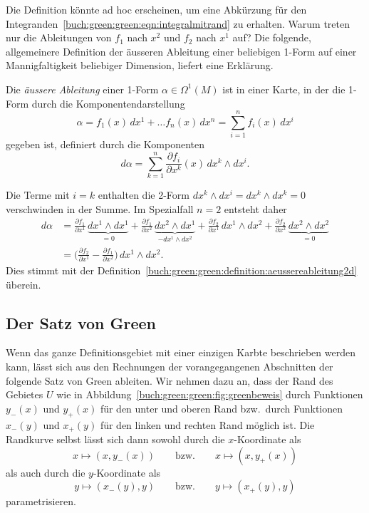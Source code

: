 Die Definition könnte ad hoc erscheinen, um eine Abkürzung für den
Integranden~\eqref{buch:green:green:eqn:integralmitrand} zu erhalten.
Warum treten nur die Ableitungen von $f_1$ nach $x^2$ und
$f_2$ nach $x^1$ auf?
Die folgende, allgemeinere Definition der äusseren Ableitung 
einer beliebigen 1-Form auf einer Mannigfaltigkeit beliebiger 
Dimension, liefert eine Erklärung.

\begin{definition}
Die {\em äussere Ableitung} einer 1-Form $\alpha\in\Omega^1(M)$ ist
in einer Karte, in der die 1-Form durch die Komponentendarstellung
\[
\alpha
=
f_1(x)\,dx^1 + \dots f_n(x)\, dx^n
=
\sum_{i=1}^n f_i(x)\,dx^i
\]
gegeben ist,
definiert durch die Komponenten
\[
d\alpha
=
\sum_{k=1}^n
\frac{\partial f_i}{\partial x^k}(x)
\,dx^k\wedge dx^i.
\]
\end{definition}

Die Terme mit $i=k$ enthalten die 2-Form $dx^k\wedge dx^i=dx^k\wedge dx^k=0$
verschwinden in der Summe.
Im Spezialfall $n=2$ entsteht daher
\begin{align*}
d\alpha
&=
\frac{\partial f_1}{\partial x^1}\,\underbrace{dx^1\wedge dx^1}_{\displaystyle=0}
+
\frac{\partial f_1}{\partial x^2}\,\underbrace{dx^2\wedge dx^1}_{\displaystyle-dx^1\wedge dx^2}
+
\frac{\partial f_2}{\partial x^1}\,dx^1\wedge dx^2
+
\frac{\partial f_2}{\partial x^2}\,\underbrace{dx^2\wedge dx^2}_{\displaystyle=0}
\\
&=
\biggl(
\frac{\partial f_2}{\partial x^1}
-
\frac{\partial f_1}{\partial x^2}
\biggr)
\,dx^1\wedge dx^2.
\end{align*}
Dies stimmt mit der
Definition~\ref{buch:green:green:definition:aeussereableitung2d}
überein.

%
%
\subsection{Der Satz von Green}
Wenn das ganze Definitionsgebiet mit einer einzigen Karbte beschrieben
werden kann, lässt sich aus den Rechnungen der vorangegangenen
Abschnitten der folgende Satz von Green ableiten.
Wir nehmen dazu an, dass der Rand des Gebietes $U$ wie in
Abbildung~\ref{buch:green:green:fig:greenbeweis}
durch Funktionen $y_-(x)$ und $y_+(x)$ für den unter und oberen Rand
bzw.~durch Funktionen $x_-(y)$ und $x_+(y)$ für den linken und rechten
Rand möglich ist.
Die Randkurve selbst lässt sich dann sowohl durch die $x$-Koordinate
als
\[
x\mapsto (x,y_-(x)) 
\qquad\text{bzw.}\qquad
x\mapsto (x,y_+(x)) 
\]
als auch durch die $y$-Koordinate als
\[
y\mapsto (x_-(y),y) 
\qquad\text{bzw.}\qquad
y\mapsto (x_+(y),y) 
\]
parametrisieren.
%

